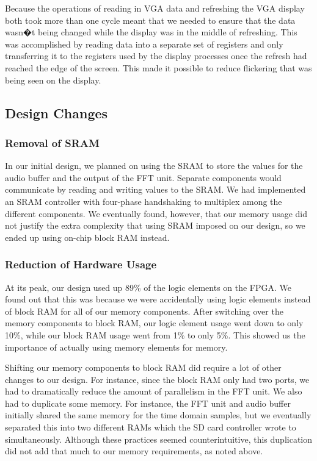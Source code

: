 \documentclass{article}
\begin{document}
Because the operations of reading in VGA data and refreshing the VGA display both 
took more than one cycle meant that we needed to ensure that the data wasn�t being 
changed while the display was in the middle of refreshing. This was accomplished by 
reading data into a separate set of registers and only transferring it to the registers 
used by the display processes once the refresh had reached the edge of the screen.  
This made it possible to reduce flickering that was being seen on the display.


\subsection{Design Changes}
\subsubsection{Removal of SRAM}

In our initial design, we planned on using the SRAM to store the values for the audio 
buffer and the output of the FFT unit. Separate components would communicate by 
reading and writing values to the SRAM. We had implemented an SRAM controller 
with four-phase handshaking to multiplex among the different components. We 
eventually found, however, that our memory usage did not justify the extra complexity 
that using SRAM imposed on our design, so we ended up using on-chip block RAM 
instead.

\subsubsection{Reduction of Hardware Usage}

At its peak, our design used up 89\% of the logic elements on the FPGA. We found out 
that this was because we were accidentally using logic elements instead of block 
RAM for all of our memory components. After switching over the memory components 
to block RAM, our logic element usage went down to only 10\%, while our block RAM 
usage went from 1\% to only 5\%. This showed us the importance of actually using 
memory elements for memory.

Shifting our memory components to block RAM did require a lot of other changes to 
our design. For instance, since the block RAM only had two ports, we had to 
dramatically reduce the amount of parallelism in the FFT unit. We also had to 
duplicate some memory. For instance, the FFT unit and audio buffer initially shared 
the same memory for the time domain samples, but we eventually separated this into 
two different RAMs which the SD card controller wrote to simultaneously. Although 
these practices seemed counterintuitive, this duplication did not add that much to our 
memory requirements, as noted above. 
\end{document}
